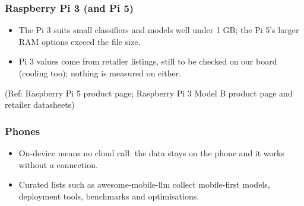 \begin{frame}[fragile]\frametitle{Raspberry Pi 3 (and Pi 5)}
\begin{center}
\footnotesize
{}
\end{center}
\begin{itemize}
\item The Pi 3 suits small classifiers and models well under 1 GB; the Pi 5's larger RAM options exceed the file size.
\item Pi 3 values come from retailer listings, still to be checked on our board (cooling too); nothing is measured on either.
\end{itemize}
{\tiny (Ref: Raspberry Pi 5 product page; Raspberry Pi 3 Model B product page and retailer datasheets)}
\end{frame}

\begin{frame}[fragile]\frametitle{Phones}
\begin{itemize}
\item On-device means no cloud call: the data stays on the phone and it works without a connection.
\item Curated lists such as awesome-mobile-llm collect mobile-first models, deployment tools, benchmarks and optimisations.
\end{itemize}
\end{frame}

